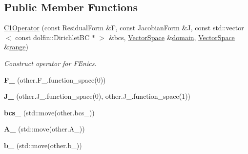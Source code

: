 \subsection*{\-Public \-Member \-Functions}
\begin{DoxyCompactItemize}
\item 
\hyperlink{classSpacy_1_1FEniCS_1_1C1Operator_af23d84bd48d0902011bf80ba2f4cd394}{\-C1\-Operator} (const \-Residual\-Form \&\-F, const \-Jacobian\-Form \&\-J, const std\-::vector$<$ const dolfin\-::\-Dirichlet\-B\-C $\ast$ $>$ \&bcs, \hyperlink{classSpacy_1_1VectorSpace}{\-Vector\-Space} \&\hyperlink{classSpacy_1_1OperatorBase_a2588f9b3e0188820c4c494e63293dc6f}{domain}, \hyperlink{classSpacy_1_1VectorSpace}{\-Vector\-Space} \&\hyperlink{classSpacy_1_1OperatorBase_ab19d3b7a6f290b1079248f1e567e53d6}{range})
\begin{DoxyCompactList}\small\item\em \-Construct operator for \-F\-Enics. \end{DoxyCompactList}\item 
\hypertarget{classSpacy_1_1FEniCS_1_1C1Operator_af56cc1d94912742db3dc1f811cf1c99b}{{\bfseries \-F\-\_\-} (other.\-F\-\_\-.\-function\-\_\-space(0))}\label{classSpacy_1_1FEniCS_1_1C1Operator_af56cc1d94912742db3dc1f811cf1c99b}

\item 
\hypertarget{classSpacy_1_1FEniCS_1_1C1Operator_a8907d5a84e6d5558de5e63c215e1b5d6}{{\bfseries \-J\-\_\-} (other.\-J\-\_\-.\-function\-\_\-space(0), other.\-J\-\_\-.\-function\-\_\-space(1))}\label{classSpacy_1_1FEniCS_1_1C1Operator_a8907d5a84e6d5558de5e63c215e1b5d6}

\item 
\hypertarget{classSpacy_1_1FEniCS_1_1C1Operator_a601e8c31ed240c16b6318702461caa92}{{\bfseries bcs\-\_\-} (std\-::move(other.\-bcs\-\_\-))}\label{classSpacy_1_1FEniCS_1_1C1Operator_a601e8c31ed240c16b6318702461caa92}

\item 
\hypertarget{classSpacy_1_1FEniCS_1_1C1Operator_acb2df6d413ebce7c46fd5f51647760dc}{{\bfseries \-A\-\_\-} (std\-::move(other.\-A\-\_\-))}\label{classSpacy_1_1FEniCS_1_1C1Operator_acb2df6d413ebce7c46fd5f51647760dc}

\item 
\hypertarget{classSpacy_1_1FEniCS_1_1C1Operator_a90c353a5a884d890aea6066b9d77f716}{{\bfseries b\-\_\-} (std\-::move(other.\-b\-\_\-))}\label{classSpacy_1_1FEniCS_1_1C1Operator_a90c353a5a884d890aea6066b9d77f716}


\end{DoxyCompactItemize}
